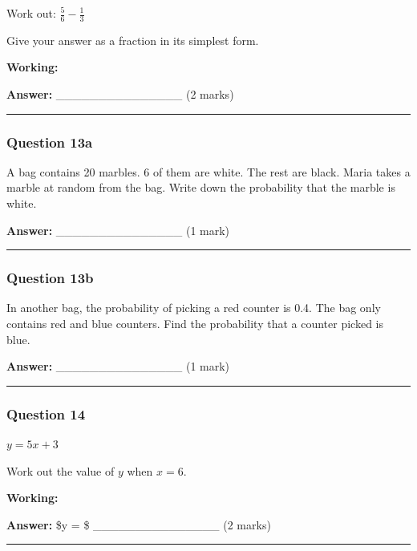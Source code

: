 Work out: \(\frac{5}{6} - \frac{1}{3}\)

Give your answer as a fraction in its simplest form.

\textbf{Working:}

\textbf{Answer:} \_\_\_\_\_\_\_\_\_\_\_\_\_\_\_ (2 marks)

\begin{center}\rule{0.5\linewidth}{0.5pt}\end{center}

\subsubsection{Question 13a}\label{question-13a}

A bag contains 20 marbles. 6 of them are white. The rest are black.
Maria takes a marble at random from the bag. Write down the probability
that the marble is white.

\textbf{Answer:} \_\_\_\_\_\_\_\_\_\_\_\_\_\_\_ (1 mark)

\begin{center}\rule{0.5\linewidth}{0.5pt}\end{center}

\subsubsection{Question 13b}\label{question-13b}

In another bag, the probability of picking a red counter is 0.4. The bag
only contains red and blue counters. Find the probability that a counter
picked is blue.

\textbf{Answer:} \_\_\_\_\_\_\_\_\_\_\_\_\_\_\_ (1 mark)

\begin{center}\rule{0.5\linewidth}{0.5pt}\end{center}

\subsubsection{Question 14}\label{question-14}

\(y = 5x + 3\)

Work out the value of \(y\) when \(x = 6\).

\textbf{Working:}

\textbf{Answer:} \$y = \$ \_\_\_\_\_\_\_\_\_\_\_\_\_\_\_ (2 marks)

\begin{center}\rule{0.5\linewidth}{0.5pt}\end{center}

